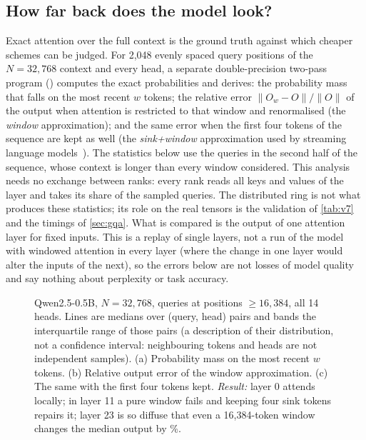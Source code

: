 \subsection{How far back does the model look?}
Exact attention over the full context is the ground truth against which cheaper
schemes can be judged. For 2{,}048 evenly spaced query positions of the
$N=32{,}768$ context and every head, a separate double-precision two-pass program
() computes the exact probabilities and derives: the probability mass that falls on the most
recent $w$ tokens; the relative error $\|O_w-O\|/\|O\|$ of the output when attention
is restricted to that window and renormalised (the \emph{window} approximation);
and the same error when the first four tokens of the sequence are kept as well (the
\emph{sink+window} approximation used by streaming language models~\cite{streaming}).
The statistics below use the queries in the second half of the sequence, whose
context is longer than every window considered. This analysis needs no exchange
between ranks: every rank reads all keys and values of the layer and takes its
share of the sampled queries. The distributed ring is not what produces these
statistics; its role on the real tensors is the validation of \cref{tab:v7} and the
timings of \cref{sec:gqa}. What is compared is the output of
one attention layer for fixed inputs. This is a replay of single layers, not a run
of the model with windowed attention in every layer (where the change in one layer
would alter the inputs of the next), so the errors below are not losses of model
quality and say nothing about perplexity or task accuracy.

\begin{figure}[t]
\centering
{}
\caption{Qwen2.5-0.5B, $N=32{,}768$, queries at positions $\ge 16{,}384$, all 14
heads. Lines are medians over (query, head) pairs and bands the interquartile range
of those pairs (a description of their distribution, not a confidence interval:
neighbouring tokens and heads are not independent samples).
(a) Probability mass on the most recent $w$ tokens. (b) Relative output error of the
window approximation. (c) The same with the first four tokens kept.
\emph{Result:} layer 0 attends locally; in layer 11 a pure window fails and keeping four
sink tokens repairs it; layer 23 is so diffuse that even a 16{,}384-token window
changes the median output by \%.}
\label{fig:realwindow}
\end{figure}

